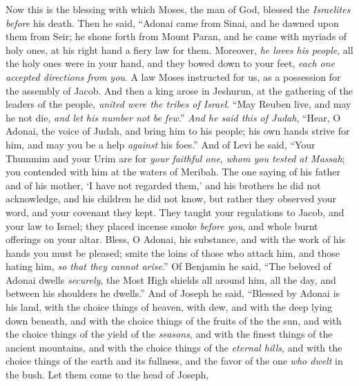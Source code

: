 \begin{biblechapter} %
 Now this is the blessing with which Moses, the man of God, blessed the \textit{Israelites} \textit{before} his death.
\verse Then he said,
\verse “Adonai came from Sinai, 
and he dawned upon them from Seir; 
he shone forth from Mount Paran, 
and he came with myriads of holy ones, 
at his right hand a fiery law for them.
\verse Moreover, \textit{he loves his people}, 
all the holy ones were in your hand, 
and they bowed down to your feet, 
\textit{each one accepted directions from you}.
\verse A law Moses instructed for us, 
as a possession for the assembly of Jacob.
\verse And then a king arose in Jeshurun, 
at the gathering of the leaders of the people, 
\textit{united were the tribes of Israel}.
\verse “May Reuben live, and may he not die, 
\textit{and let his number not be few}.”
\verse \textit{And he said this of Judah}, 
“Hear, O Adonai, the voice of Judah, 
and bring him to his people; 
his own hands strive for him, 
and may you be a help \textit{against} his foes.”
\verse And of Levi he said, 
“Your Thummim and your Urim 
are for \textit{your faithful one}, 
\textit{whom you tested at Massah}; 
you contended with him 
at the waters of Meribah.
\verse The one saying of his father and of his mother, 
‘I have not regarded them,’ 
and his brothers he did not acknowledge, 
and his children he did not know, 
but rather they observed your word, 
and your covenant they kept.
\verse They taught your regulations to Jacob, 
and your law to Israel; 
they placed incense smoke \textit{before you}, 
and whole burnt offerings on your altar.
\verse Bless, O Adonai, his substance, 
and with the work of his hands you must be pleased; 
smite the loins of those who attack him, 
and those hating him, \textit{so that they cannot arise}.”
\verse Of Benjamin he said, 
“The beloved of Adonai dwells \textit{securely}, 
the Most High shields all around him, 
all the day, 
and between his shoulders he dwells.”
\verse And of Joseph he said, 
“Blessed by Adonai is his land, 
with the choice things of heaven, 
with dew, and with the deep lying down beneath,
\verse and with the choice things of the fruits of the the sun, 
and with the choice things of the yield of the \textit{seasons},
\verse and with the finest things of the ancient mountains, 
and with the choice things of the \textit{eternal hills},
\verse and with the choice things of the earth and its fullness, 
and the favor of the one \textit{who dwelt} in the bush. 
Let them come to the head of Joseph, 

\end{biblechapter}
